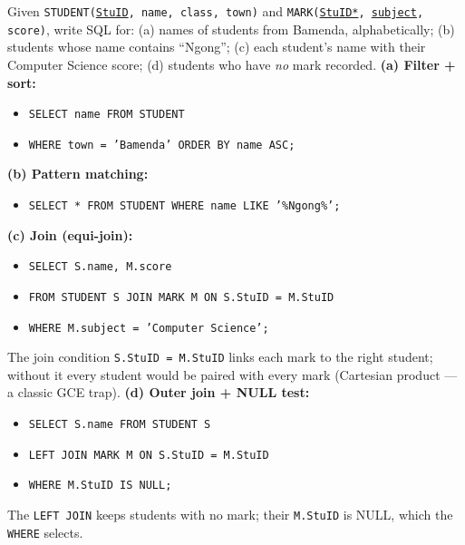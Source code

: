 \documentclass[11pt]{article}
\begin{document}
\begin{exoresolu}
Given \texttt{STUDENT(\underline{StuID}, name, class, town)} and \texttt{MARK(\underline{StuID*}, \underline{subject}, score)}, write SQL for: (a) names of students from Bamenda, alphabetically; (b) students whose name contains ``Ngong''; (c) each student's name with their Computer Science score; (d) students who have \emph{no} mark recorded.
\tcblower
\textbf{(a) Filter + sort:}
\begin{itemize}
\item[] \texttt{SELECT name FROM STUDENT}
\item[] \texttt{WHERE town = 'Bamenda' ORDER BY name ASC;}
\end{itemize}
\textbf{(b) Pattern matching:}
\begin{itemize}
\item[] \texttt{SELECT * FROM STUDENT WHERE name LIKE '\%Ngong\%';}
\end{itemize}
\textbf{(c) Join (equi-join):}
\begin{itemize}
\item[] \texttt{SELECT S.name, M.score}
\item[] \texttt{FROM STUDENT S JOIN MARK M ON S.StuID = M.StuID}
\item[] \texttt{WHERE M.subject = 'Computer Science';}
\end{itemize}
The join condition \texttt{S.StuID = M.StuID} links each mark to the right student; without it every student would be paired with every mark (Cartesian product — a classic GCE trap).
\textbf{(d) Outer join + NULL test:}
\begin{itemize}
\item[] \texttt{SELECT S.name FROM STUDENT S}
\item[] \texttt{LEFT JOIN MARK M ON S.StuID = M.StuID}
\item[] \texttt{WHERE M.StuID IS NULL;}
\end{itemize}
The \texttt{LEFT JOIN} keeps students with no mark; their \texttt{M.StuID} is NULL, which the \texttt{WHERE} selects.
\end{exoresolu}
\end{document}

